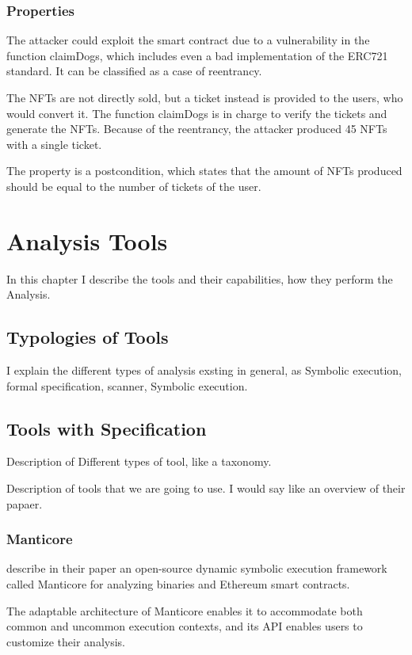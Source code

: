 \subsection{Properties}
\label{sec:DirtyDogs:Properties}
The attacker could exploit the smart contract due to a vulnerability in the function claimDogs, 
which includes even a bad implementation of the ERC721 standard. It can be classified as a case of reentrancy. 

The NFTs are not directly sold, but a ticket instead is provided to the users, who would convert it. The function claimDogs 
is in charge to verify the tickets and generate the NFTs. Because of the reentrancy, the attacker produced 45 NFTs with a single ticket.

The property is a postcondition, which states that the amount of NFTs produced should be equal to the number of tickets of the user.


\chapter{Analysis Tools}
\label{ch:Tools}
In this chapter I describe the tools and their capabilities, how they perform the Analysis.

\section{Typologies of Tools}
\label{sec:Tools:Typologies}
I explain the different types of analysis exsting in general, as Symbolic execution, formal specification, scanner, Symbolic execution.

\section{Tools with Specification}
\label{sec:Tools:Specification}
Description of Different types of tool, like a taxonomy.

Description of tools that we are going to use. 
I would say like an overview of their papaer.

\subsection{Manticore}
\label{sec:Specification:Manticore}
\citet{ManticorePaper} describe in their paper an open-source dynamic
symbolic execution framework called Manticore for analyzing
binaries and Ethereum smart contracts.

The adaptable architecture of Manticore enables it to accommodate both common and uncommon execution contexts, 
and its API enables users to customize their analysis. 

